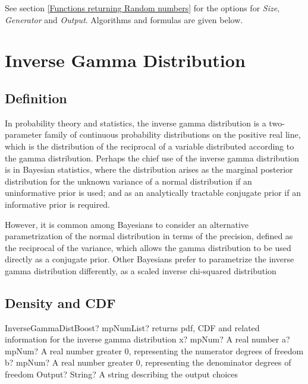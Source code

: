\vspace{0.3cm}
See section \ref{Functions returning Random numbers} for the options for  {\itshape\sffamily Size},  {\itshape\sffamily Generator} and {\itshape\sffamily Output}. Algorithms and formulas are given below.





\section{Inverse Gamma Distribution}


\subsection{Definition}
\label{InverseGammaDistributionDefinition}

In probability theory and statistics, the inverse gamma distribution is a two-parameter family of continuous probability distributions on the positive real line, which is the distribution of the reciprocal of a variable distributed according to the gamma distribution. Perhaps the chief use of the inverse gamma distribution is in Bayesian statistics, where the distribution arises as the marginal posterior distribution for the unknown variance of a normal distribution if an uninformative prior is used; and as an analytically tractable conjugate prior if an informative prior is required.

However, it is common among Bayesians to consider an alternative parametrization of the normal distribution in terms of the precision, defined as the reciprocal of the variance, which allows the gamma distribution to be used directly as a conjugate prior. Other Bayesians prefer to parametrize the inverse gamma distribution differently, as a scaled inverse chi-squared distribution



\subsection{Density and CDF}

\begin{mpFunctionsExtract}
	\mpFunctionFour
	{InverseGammaDistBoost? mpNumList? returns pdf, CDF and related information for the inverse gamma distribution}
	{x? mpNum? A real number}
	{a? mpNum? A real number greater 0, representing the numerator  degrees of freedom}
	{b? mpNum? A real number greater 0, representing the denominator degrees of freedom}
	{Output? String? A string describing the output choices}
\end{mpFunctionsExtract}


